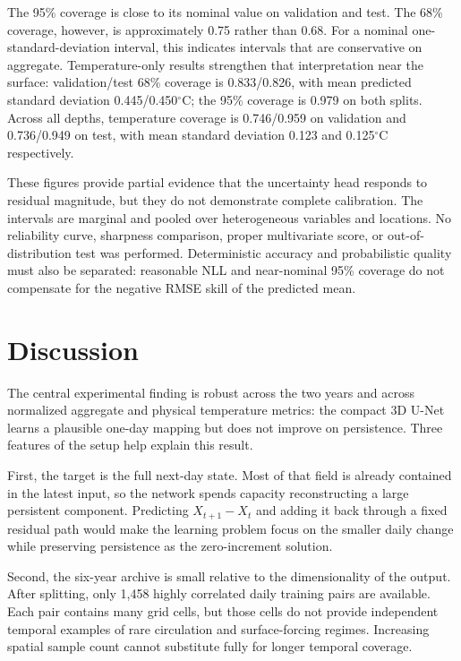 The 95\% coverage is close to its nominal value on validation and test. The 68\% coverage, however, is approximately 0.75 rather than 0.68. For a nominal one-standard-deviation interval, this indicates intervals that are conservative on aggregate. Temperature-only results strengthen that interpretation near the surface: validation/test 68\% coverage is 0.833/0.826, with mean predicted standard deviation 0.445/0.450$^{\circ}$C; the 95\% coverage is 0.979 on both splits. Across all depths, temperature coverage is 0.746/0.959 on validation and 0.736/0.949 on test, with mean standard deviation 0.123 and 0.125$^{\circ}$C respectively.

These figures provide partial evidence that the uncertainty head responds to residual magnitude, but they do not demonstrate complete calibration. The intervals are marginal and pooled over heterogeneous variables and locations. No reliability curve, sharpness comparison, proper multivariate score, or out-of-distribution test was performed. Deterministic accuracy and probabilistic quality must also be separated: reasonable NLL and near-nominal 95\% coverage do not compensate for the negative RMSE skill of the predicted mean.

\section{Discussion}

The central experimental finding is robust across the two years and across normalized aggregate and physical temperature metrics: the compact 3D U-Net learns a plausible one-day mapping but does not improve on persistence. Three features of the setup help explain this result.

First, the target is the full next-day state. Most of that field is already contained in the latest input, so the network spends capacity reconstructing a large persistent component. Predicting $X_{t+1}-X_t$ and adding it back through a fixed residual path would make the learning problem focus on the smaller daily change while preserving persistence as the zero-increment solution.

Second, the six-year archive is small relative to the dimensionality of the output. After splitting, only 1,458 highly correlated daily training pairs are available. Each pair contains many grid cells, but those cells do not provide independent temporal examples of rare circulation and surface-forcing regimes. Increasing spatial sample count cannot substitute fully for longer temporal coverage.

